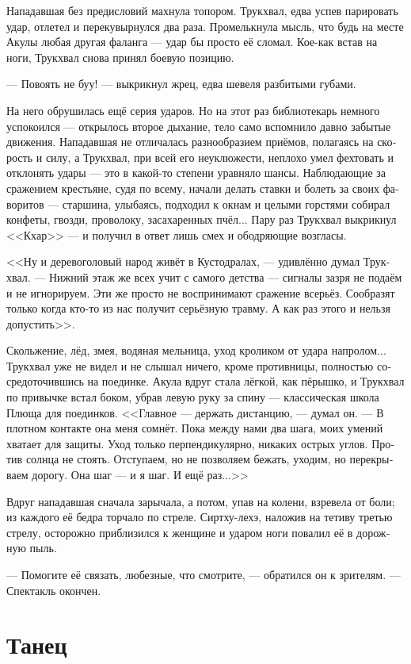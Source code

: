 \documentclass[a4paper,12pt,fleqn]{book}\usepackage{cooltooltips}\usepackage{polyglossia}\setdefaultlanguage[babelshorthands=true]{russian}\setotherlanguage{english}\defaultfontfeatures{Ligatures=TeX,Mapping=tex-text} \usepackage{xcolor}\definecolor{lightgray}{HTML}{bbbbbb}\color{lightgray}\newcommand{\ml}[3]{\textenglish{\textcolor{black}{#3}} }
\begin{document}
Нападавшая без предисловий махнула топором.
Трукхвал, едва успев парировать удар, отлетел и перекувырнулся два раза.
Промелькнула мысль, что будь на месте Акулы любая другая фаланга --- удар бы просто её сломал.
Кое-как встав на ноги, Трукхвал снова принял боевую позицию.

--- Повоять не буу! --- выкрикнул жрец, едва шевеля разбитыми губами.

На него обрушилась ещё серия ударов.
Но на этот раз библиотекарь немного успокоился --- открылось второе дыхание, тело само вспомнило давно забытые движения.
Нападавшая не отличалась разнообразием приёмов, полагаясь на скорость и силу, а Трукхвал, при всей его неуклюжести, неплохо умел фехтовать и отклонять удары --- это в какой-то степени уравняло шансы.
Наблюдающие за сражением крестьяне, судя по всему, начали делать ставки и болеть за своих фаворитов --- старшина, улыбаясь, подходил к окнам и целыми горстями собирал конфеты, гвозди, проволоку, засахаренных пчёл...
Пару раз Трукхвал выкрикнул <<Кхар>> --- и получил в ответ лишь смех и ободряющие возгласы.

<<Ну и деревоголовый народ живёт в Кустодралах, --- удивлённо думал Трукхвал.
--- Нижний этаж же всех учит с самого детства --- сигналы зазря не подаём и не игнорируем.
Эти же просто не воспринимают сражение всерьёз.
Сообразят только когда кто-то из нас получит серьёзную травму.
А как раз этого и нельзя допустить>>.

Скольжение, лёд, змея, водяная мельница, уход кроликом от удара напролом...
Трукхвал уже не видел и не слышал ничего, кроме противницы, полностью сосредоточившись на поединке.
Акула вдруг стала лёгкой, как пёрышко, и Трукхвал по привычке встал боком, убрав левую руку за спину --- классическая школа Плюща для поединков.
<<Главное --- держать дистанцию, --- думал он.
--- В плотном контакте она меня сомнёт.
Пока между нами два шага, моих умений хватает для защиты.
Уход только перпендикулярно, никаких острых углов.
Против солнца не стоять.
Отступаем, но не позволяем бежать, уходим, но перекрываем дорогу.
Она шаг --- и я шаг.
И ещё раз...>>

Вдруг нападавшая сначала зарычала, а потом, упав на колени, взревела от боли;
из каждого её бедра торчало по стреле.
Сиртху-лехэ, наложив на тетиву третью стрелу, осторожно приблизился к женщине и ударом ноги повалил её в дорожную пыль.

--- Помогите её связать, любезные, что смотрите, --- обратился он к зрителям.
--- Спектакль окончен.

\section{Танец}
\end{document}
